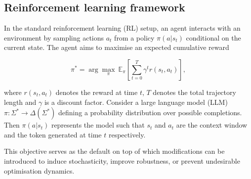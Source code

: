 

\subsection{Reinforcement learning framework}

In the standard reinforcement learning (RL) setup, an agent interacts with an environment by sampling actions $a_t$ from a policy $\pi(a|s_t)$ conditional on the current state. The agent aims to maximise an expected cumulative reward

\begin{equation}
    \pi^* = \arg \underset{\pi}{\max}\ \mathbb{E}_\pi
    \left[\sum^T_{t=0}\gamma^t r(s_t, a_t)\right],
\end{equation}

where $r(s_t, a_t)$ denotes the reward at time $t$, $T$ denotes the total trajectory length and $\gamma$ is a discount factor. Consider a large language model (LLM) $\pi: \Sigma^* \to \Delta(\Sigma^*)$ defining a probability distribution over possible completions. Then $\pi(a|s_t)$ represents the model such that $s_t$ and $a_t$ are the context window and the token generated at time $t$ respectively.

This objective serves as the default on top of which modifications can be introduced to induce stochasticity, improve robustness, or prevent undesirable optimisation dynamics.

